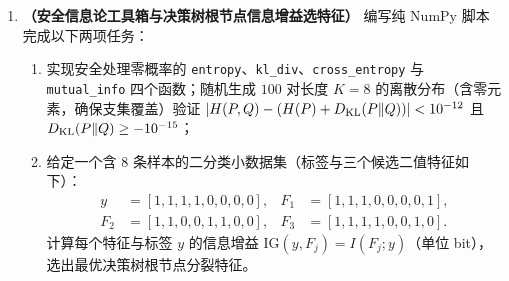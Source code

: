 
\begin{enumerate}[label=\textbf{4.\arabic*}, leftmargin=2.4em, resume]
  \item \textbf{（安全信息论工具箱与决策树根节点信息增益选特征）} 编写纯 NumPy 脚本完成以下两项任务：
  \begin{enumerate}[label=(\arabic*), leftmargin=1.8em]
    \item 实现安全处理零概率的 \texttt{entropy}、\texttt{kl\_div}、\texttt{cross\_entropy} 与 \texttt{mutual\_info} 四个函数；随机生成 $100$ 对长度 $K = 8$ 的离散分布（含零元素，确保支集覆盖）验证 $|H(P, Q) - (H(P) + D_{\mathrm{KL}}(P\|Q))| < 10^{-12}$ 且 $D_{\mathrm{KL}}(P\|Q) \ge -10^{-15}$；
    \item 给定一个含 $8$ 条样本的二分类小数据集（标签与三个候选二值特征如下）：
    \begin{align*}
      y &= [1, 1, 1, 1, 0, 0, 0, 0], & F_1 &= [1, 1, 1, 0, 0, 0, 0, 1], \\
      F_2 &= [1, 1, 0, 0, 1, 1, 0, 0], & F_3 &= [1, 1, 1, 1, 0, 0, 1, 0].
    \end{align*}
    计算每个特征与标签 $y$ 的信息增益 $\mathrm{IG}(y, F_j) = I(F_j; y)$（单位 bit），选出最优决策树根节点分裂特征。
  \end{enumerate}
  \par\smallskip{}


\end{enumerate}
